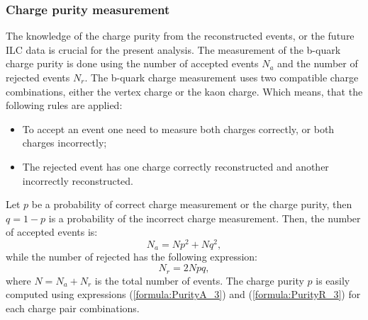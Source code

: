 \subsubsection{Charge purity measurement}
\label{sec:ChargePurity}
The knowledge of the charge purity from the reconstructed events, or the future ILC data is crucial for the present analysis. 
The measurement of the b-quark charge purity is done using the number of accepted events $N_a$ and the number of rejected events $N_r$. 
The b-quark charge measurement uses two compatible charge combinations, either the vertex charge or the kaon charge.
 Which means, that the following rules are applied:
\begin{itemize}
	\item To accept an event one need to measure both charges correctly, or both charges incorrectly;
	\item The rejected event has one charge correctly reconstructed and another incorrectly reconstructed. 
\end{itemize}

Let $p$ be a probability of correct charge measurement or the charge purity, then $q = 1-p$ is a probability of the incorrect charge measurement. 
Then, the number of accepted events is:
\begin{equation}
	N_a = N p^2 + N q^2,
	\label{formula:PurityA_3}
\end{equation}
while the number of rejected has the following expression:
\begin{equation}
	N_r = 2N pq,
	\label{formula:PurityR_3}
\end{equation}
where $N = N_a + N_r$ is the total number of events.
The charge purity $p$ is easily computed using expressions (\ref{formula:PurityA_3}) and (\ref{formula:PurityR_3}) for each charge pair combinations.


